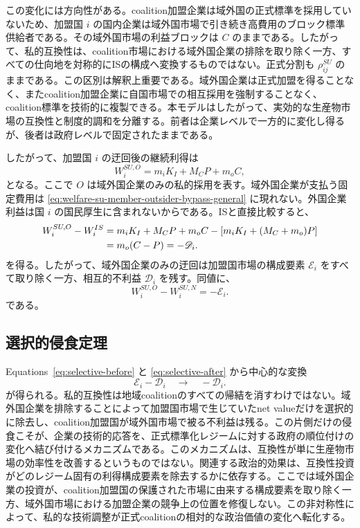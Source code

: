 この変化には方向性がある。coalition加盟企業は域外国の正式標準を採用していないため、加盟国 $i$ の国内企業は域外国市場で引き続き高費用のブロック標準供給者である。その域外国市場の利益ブロックは $C$ のままである。したがって、私的互換性は、coalition市場における域外国企業の排除を取り除く一方、すべての仕向地を対称的にISの構成へ変換するものではない。正式分割も $\rho_{ij}^{SU}$ のままである。この区別は解釈上重要である。域外国企業は正式加盟を得ることなく、またcoalition加盟企業に自国市場での相互採用を強制することなく、coalition標準を技術的に複製できる。本モデルはしたがって、実効的な生産物市場の互換性と制度的調和を分離する。前者は企業レベルで一方的に変化し得るが、後者は政府レベルで固定されたままである。

したがって、加盟国 $i$ の迂回後の継続利得は
\begin{equation}
    W_i^{SU,O}
    =m_iK_I+M_CP+m_oC,
    \label{eq:welfare-su-member-outsider-bypass-general}
\end{equation}
となる。ここで $O$ は域外国企業のみの私的採用を表す。域外国企業が支払う固定費用は \eqref{eq:welfare-su-member-outsider-bypass-general} に現れない。外国企業利益は国 $i$ の国民厚生に含まれないからである。ISと直接比較すると、
\begin{align}
    W_i^{SU,O}-W_i^{IS}
    & =m_iK_I+M_CP+m_oC
       -\left[m_iK_I+(M_C+m_o)P\right] \notag\\
    & =m_o(C-P)
     =-\mathscr D_i.
    \label{eq:selective-after}
\end{align}
を得る。したがって、域外国企業のみの迂回は加盟国市場の構成要素 $\mathscr E_i$ をすべて取り除く一方、相互的不利益 $\mathscr D_i$ を残す。同値に、
\begin{equation}
    \boxed{
    W_i^{SU,O}-W_i^{SU,N}
    =-\mathscr E_i.
    }
    \label{eq:erosion-size}
\end{equation}
である。

\subsection{選択的侵食定理}
\label{subsec:selective-theorem}

Equations~\eqref{eq:selective-before} と \eqref{eq:selective-after} から中心的な変換
\begin{equation}
    \boxed{
    \mathscr E_i-\mathscr D_i
    \quad\longrightarrow\quad
    -\mathscr D_i.
    }
    \label{eq:selective-erosion-identity}
\end{equation}
が得られる。私的互換性は地域coalitionのすべての帰結を消すわけではない。域外国企業を排除することによって加盟国市場で生じていたnet valueだけを選択的に除去し、coalition加盟国が域外国市場で被る不利益は残る。この片側だけの侵食こそが、企業の技術的応答を、正式標準化レジームに対する政府の順位付けの変化へ結び付けるメカニズムである。このメカニズムは、互換性が単に生産物市場の効率性を改善するというものではない。関連する政治的効果は、互換性投資がどのレジーム固有の利得構成要素を除去するかに依存する。ここでは域外国企業の投資が、coalition加盟国の保護された市場に由来する構成要素を取り除く一方、域外国市場における加盟企業の競争上の位置を修復しない。この非対称性によって、私的な技術調整が正式coalitionの相対的な政治価値の変化へ転化する。

